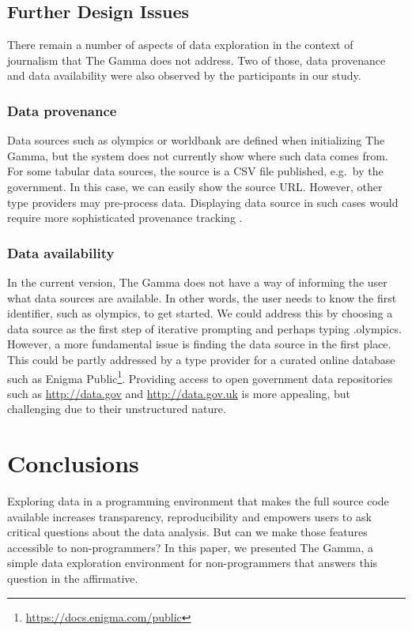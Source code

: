 \documentclass[manuscript,review,anonymous]{acmart}
\newcommand{\ikvd}[1]{{\fontfamily{zi4}\selectfont\small #1}}
\begin{document}
\subsection{Further Design Issues}
There remain a number of aspects of data exploration in the context of journalism that
The Gamma does not address. Two of those, data provenance and data availability were also
observed by the participants in our study.

\subsubsection*{Data provenance}
Data sources such as \ikvd{olympics} or \ikvd{worldbank} are defined when initializing The Gamma,
but the system does not currently show where such data comes from.
For some tabular data sources, the source is a CSV file published, e.g.~by the government. In this case,
we can easily show the source URL. However, other type providers may pre-process data. Displaying
data source in such cases would require more sophisticated provenance tracking \cite{provenance}.

\subsubsection*{Data availability}
In the current version, The Gamma does not have a way of informing the user what data sources
are available. In other words, the user needs to know the first identifier, such as \ikvd{olympics},
to get started. We could address this by choosing a data source as the first step of iterative
prompting and perhaps typing \ikvd{.olympics}. However, a more fundamental issue is finding
the data source in the first place. This could be partly addressed by a type provider for a
curated online database such as Enigma Public\footnote{\url{https://docs.enigma.com/public}}.
Providing access to open government data repositories such as \url{http://data.gov} and
\url{http://data.gov.uk} is more appealing, but challenging due to their unstructured nature.

\section{Conclusions}
Exploring data in a programming environment that makes the full source code available increases
transparency, reproducibility and empowers users to ask critical questions about the data analysis.
But can we make those features accessible to non-programmers? In this paper, we presented The Gamma,
a simple data exploration environment for non-programmers that answers this question in the
affirmative.
\end{document}
